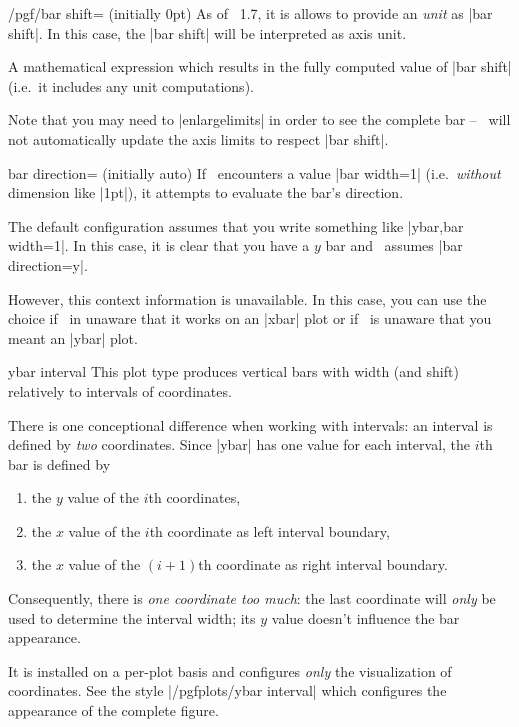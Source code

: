{\begin{key}{/pgf/bar shift= (initially 0pt)}
	As of \PGFPlots\ 1.7, it is allows to provide an \emph{unit} as |bar shift|. In this case, the |bar shift| will be interpreted as axis unit.
	\begin{command}{\pgfplotbarshift}
		A mathematical expression which results in the fully computed value of |bar shift| (i.e.\ it includes any unit computations). 
	\end{command}
	Note that you may need to |enlargelimits| in order to see the complete bar -- \PGFPlots\ will not automatically update the axis limits to respect |bar shift|.
\end{key}

\begin{pgfplotskey}{bar direction= (initially auto)}
	If \PGFPlots\ encounters a value |bar width=1| (i.e.\ \emph{without} dimension like |1pt|), it attempts to evaluate the bar's direction.

	The default configuration  assumes that you write something like |ybar,bar width=1|. In this case, it is clear that you have a $y$ bar and \PGFPlots\ assumes |bar direction=y|.

	However, this context information is unavailable. In this case, you can use the choice  if \PGFPlots\ in unaware that it works on an |xbar| plot or  if \PGFPlots\ is unaware that you meant an |ybar| plot.
\end{pgfplotskey}

\begin{plottype}{ybar interval}
	This plot type produces vertical bars with width (and shift) relatively to intervals of coordinates.

	There is one conceptional difference when working with intervals: an interval is defined by \emph{two} coordinates. Since |ybar| has one value for each interval, the $i$th bar is defined by
	\begin{enumerate}
		\item the $y$ value of the $i$th coordinates,
		\item the $x$ value of the $i$th coordinate as left interval boundary,
		\item the $x$ value of the $(i+1)$th coordinate as right interval boundary.
	\end{enumerate}
	Consequently, there is \emph{one coordinate too much}: the last coordinate will \emph{only} be used to determine the interval width; its $y$ value doesn't influence the bar appearance.

	It is installed on a per-plot basis and configures \emph{only} the visualization of coordinates. See the style |/pgfplots/ybar interval| which configures the appearance of the complete figure.
\begin{codeexample}[]
\end{codeexample}


\end{plottype}}
